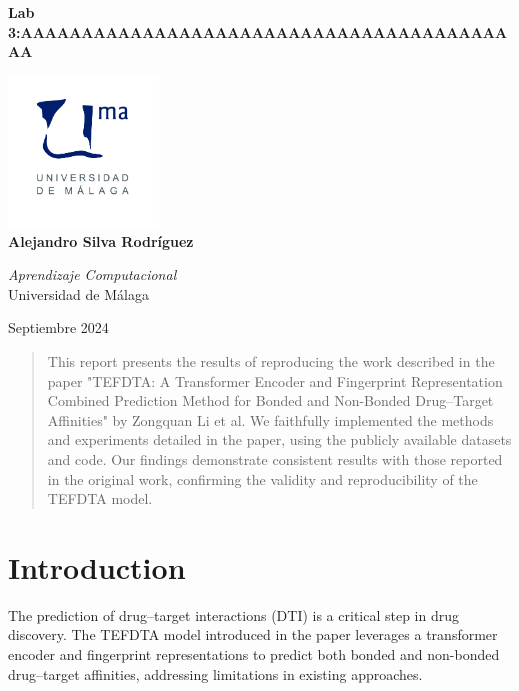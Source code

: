 \documentclass{article}
\begin{document}
\begin{titlepage}
	\centering
	\vspace*{3cm}
	
	{\Huge \textbf{Lab 3:AAAAAAAAAAAAAAAAAAAAAAAAAAAAAAAAAAAAAAAAAA}\\[0.5cm]}
	
	\vspace{2cm}
	\includegraphics[width=0.3\textwidth]{images/uma_logo.jpg}\\[1cm]
	
	{\LARGE \textbf{Alejandro Silva Rodríguez}\\[0.5cm]}

	{\large \textit{Aprendizaje Computacional}\\
		Universidad de Málaga\\
		}
	
	\vfill
	
	{\large Septiembre 2024}
\end{titlepage}

\tableofcontents

\newpage

\begin{abstract}
	This report presents the results of reproducing the work described in the paper "TEFDTA: A Transformer Encoder and Fingerprint Representation Combined Prediction Method for Bonded and Non-Bonded Drug–Target Affinities" by Zongquan Li et al. We faithfully implemented the methods and experiments detailed in the paper, using the publicly available datasets and code. Our findings demonstrate consistent results with those reported in the original work, confirming the validity and reproducibility of the TEFDTA model. 
\end{abstract}

\section{Introduction}
The prediction of drug–target interactions (DTI) is a critical step in drug discovery. The TEFDTA model introduced in the paper leverages a transformer encoder and fingerprint representations to predict both bonded and non-bonded drug–target affinities, addressing limitations in existing approaches.
\end{document}
